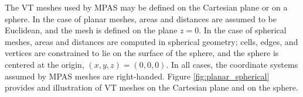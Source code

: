 \documentclass[11pt]{report}
\begin{document}
The VT meshes used by MPAS may be defined on the Cartesian plane or on a
sphere. In the case of planar meshes, areas and distances are assumed to be
Euclidean, and the mesh is defined on the plane $z=0$. In the case of spherical
meshes, areas and distances are computed in spherical geometry; cells, edges,
and vertices are constrained to lie on the surface of the sphere, and the
sphere is centered at the origin, $(x,y,z)=(0,0,0)$. In all cases, the
coordinate systems assumed by MPAS meshes are right-handed. Figure
\ref{fig:planar_spherical} provides and illustration of VT meshes on the
Cartesian plane and on the sphere.

\begin{figure}[htb]
\begin{center}

\end{center}
\end{figure}
\end{document}
